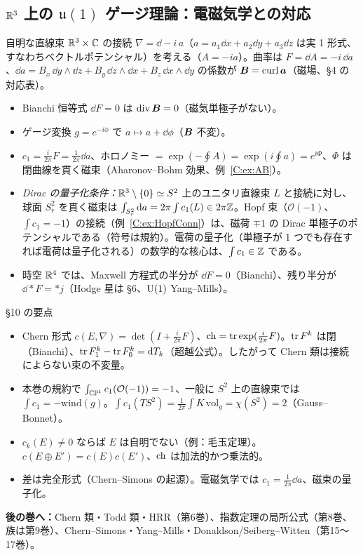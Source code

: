 \subsection{$\mathbb R^3$ 上の $\mathfrak u(1)$ ゲージ理論：電磁気学との対応}
自明な直線束 $\mathbb R^3\times\mathbb C$ の接続 $\nabla=\dd-i\,a$（$a=a_1\dd x+a_2\dd y+a_3\dd z$ は実 1 形式、すなわちベクトルポテンシャル）を考える（$A=-ia$）。曲率は $F=\dd A=-i\,\dd a$、$\dd a=B_x\,\dd y\wedge\dd z+B_y\,\dd z\wedge\dd x+B_z\,\dd x\wedge\dd y$ の係数が $\boldsymbol B=\operatorname{curl}\boldsymbol a$（磁場、§4 の対応表）。
\begin{itemize}
\item Bianchi 恒等式 $\dd F=0$ は $\operatorname{div}\boldsymbol B=0$（磁気単極子がない）。
\item ゲージ変換 $g=e^{-i\phi}$ で $a\mapsto a+\dd\phi$（$\boldsymbol B$ 不変）。
\item $c_1=\frac i{2\pi}F=\frac1{2\pi}\dd a$、ホロノミー $=\exp(-\oint A)=\exp(i\oint a)=e^{i\Phi}$、$\Phi$ は閉曲線を貫く磁束（Aharonov--Bohm 効果、例~\ref{C:ex:AB}）。
\item \emph{Dirac の量子化条件：}$\mathbb R^3\setminus\{0\}\simeq S^2$ 上のユニタリ直線束 $L$ と接続に対し、球面 $S^2_r$ を貫く磁束は $\int_{S^2_r}\mathrm{d} a=2\pi\int c_1(L)\in2\pi\mathbb Z$。Hopf 束（$\mathcal O(-1)$、$\int c_1=-1$）の接続（例~\ref{C:ex:HopfConn}）は、磁荷 $\mp1$ の Dirac 単極子のポテンシャルである（符号は規約）。電荷の量子化（単極子が 1 つでも存在すれば電荷は量子化される）の数学的な核心は、$\int c_1\in\mathbb Z$ である。
\item 時空 $\mathbb R^4$ では、Maxwell 方程式の半分が $\dd F=0$（Bianchi）、残り半分が $\dd\ast F=\ast j$（Hodge 星は §6、$\mathrm{U}(1)$ Yang--Mills）。
\end{itemize}

\begin{keybox}{§10 の要点}
\begin{itemize}
\item Chern 形式 $c(E,\nabla)=\det(I+\frac i{2\pi}F)$、$\mathrm{ch}=\operatorname{tr}\exp(\frac i{2\pi}F)$。$\operatorname{tr} F^k$ は閉（Bianchi）、$\operatorname{tr} F_1^k-\operatorname{tr} F_0^k=\mathrm{d} T_k$（超越公式）。したがって Chern 類は接続によらない束の不変量。
\item 本巻の規約で $\int_{\mathbb{CP}^1}c_1(\mathcal O(-1))=-1$、一般に $S^2$ 上の直線束では $\int c_1=-\mathrm{wind}(g)$。$\int c_1(TS^2)=\frac1{2\pi}\int K\,\mathrm{vol}_g=\chi(S^2)=2$（Gauss--Bonnet）。
\item $c_k(E)\ne0$ ならば $E$ は自明でない（例：毛玉定理）。$c(E\oplus E')=c(E)c(E')$、$\mathrm{ch}$ は加法的かつ乗法的。
\item 差は完全形式（Chern--Simons の起源）。電磁気学では $c_1=\frac1{2\pi}\dd a$、磁束の量子化。
\end{itemize}
\textbf{後の巻へ：}Chern 類・Todd 類・HRR（第6巻）、指数定理の局所公式（第8巻、族は第9巻）、Chern--Simons・Yang--Mills・Donaldson/Seiberg--Witten（第15〜17巻）。
\end{keybox}

